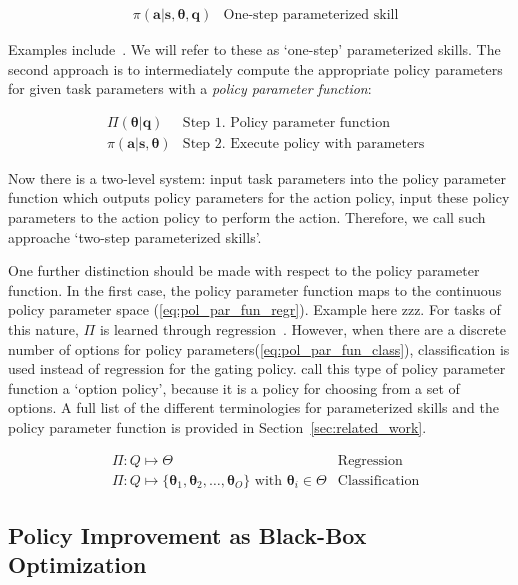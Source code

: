 \documentclass[12pt]{article}
\newcommand{\mymath}[1]{\ensuremath{#1}\xspace}
\newcommand{\pol}    {\mymath{\pi}}
\newcommand{\act}    {\mymath{\mathbf{a}}}
\newcommand{\sta}    {\mymath{\mathbf{s}}}
\newcommand{\app}    {\mymath{\bm{\theta}}}
\newcommand{\appsp}  {\mymath{\Theta}}
\newcommand{\polg}   {\mymath{\Pi}}
\newcommand{\taskp}  {\mymath{\mathbf{q}}}
\newcommand{\taskpsp}{\mymath{Q}}
\begin{document}
\begin{align}
& \pol(\act|\sta,\app,\taskp) & \mbox{One-step parameterized skill}
\end{align}

Examples include~\cite{matsubara11learning,stulp13learning}. We will refer to these as `one-step' parameterized skills. The second approach is to intermediately compute the appropriate policy parameters for given task parameters with a \emph{policy parameter function}:

\begin{align}
&\polg(\app|\taskp)          & \mbox{Step 1. Policy parameter function}\label{eq:pol_par_fun}\\
&\pol(\act|\sta,\app) & \mbox{Step 2. Execute policy with parameters}
\end{align}

Now there is a two-level system: input task parameters into the policy parameter function which outputs policy parameters for the action policy, input these policy parameters to the action policy to perform the action. Therefore, we call such approache `two-step parameterized skills'.

One further distinction should be made with respect to the policy parameter function. In the first case, the policy parameter function maps to the continuous policy parameter space (\ref{eq:pol_par_fun_regr}). Example here zzz. For tasks of this nature, \polg is learned through regression~\cite{ude10taskspecific,matsubara11learning,silva12learning,stulp13learning}.
However, when there are a discrete number of options for policy parameters(\ref{eq:pol_par_fun_class}), classification is used instead of regression for the gating policy. \citet{daniel12learning} call this type of policy parameter function a `option policy', because it is a policy for choosing from a set of options. A full list of the different terminologies for parameterized skills and the policy parameter function is provided in Section~\ref{sec:related_work}. 

\begin{align}
&\polg : \taskpsp \mapsto \appsp & \mbox{Regression} \label{eq:pol_par_fun_regr}\\
&\polg : \taskpsp \mapsto \{\app_1,\app_2,\dots,\app_O\} \mbox{~with~} \app_i \in \appsp & \mbox{Classification} \label{eq:pol_par_fun_class}
\end{align}

\subsection{Policy Improvement as Black-Box Optimization}
\end{document}
